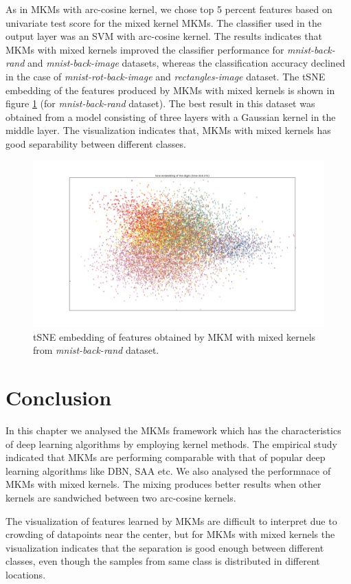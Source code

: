 As in MKMs with arc-cosine kernel, we chose top 5 percent features based on univariate test score for the mixed kernel MKMs. The classifier used in the output layer was an SVM with arc-cosine kernel. The results indicates that MKMs with mixed kernels improved the classifier performance for \textit{mnist-back-rand} and \textit{mnist-back-image} datasets, whereas the classification accuracy declined in the case of \textit{mnist-rot-back-image} and \textit{rectangles-image} dataset. The tSNE embedding of the features produced by MKMs with mixed kernels is shown in figure \ref{tsne_rand_mkmmix} (for \textit{mnist-back-rand} dataset). The best result in this dataset was obtained from a model consisting of three layers with a Gaussian kernel in the middle layer. The visualization indicates that, MKMs with mixed kernels has good separability between different classes.
\begin{figure}
  \centering
  \captionsetup{justification=centering,margin=0.1cm}
  \includegraphics[scale=0.45]{figures/tsne_rand_mkmmix}
  \caption{tSNE embedding of features obtained by MKM with mixed kernels from \textit{mnist-back-rand} dataset.}
  \label{tsne_rand_mkmmix}
\end{figure}


\section{Conclusion}
\label{chap2_conc}
In this chapter we analysed the MKMs framework which has the characteristics of deep learning algorithms by employing  kernel methods. The empirical study indicated that MKMs are performing comparable with that of  popular deep learning algorithms like DBN, SAA etc. We also analysed the performnace of MKMs with mixed kernels. The mixing produces better results when other kernels are sandwiched between two arc-cosine kernels.

The visualization of features learned by MKMs are difficult to interpret due to crowding of datapoints near the center, but for MKMs with mixed kernels the visualization indicates that the separation is good enough between different classes, even though the samples from same class is distributed in different locations.
